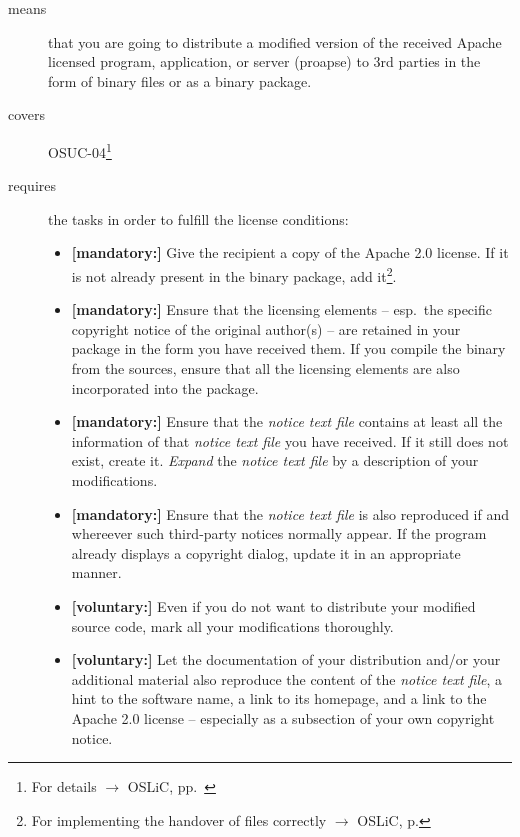 \begin{description}
\item[means] that you are going to distribute a modified version of the received
Apache licensed pro\-gram, application, or server (proapse) to 3rd parties in
the form of binary files or as a binary package.
\item[covers] OSUC-04\footnote{For details $\rightarrow$ OSLiC, pp.\ \pageref{OSUC-04-DEF}}
\item[requires] the tasks in order to fulfill the license conditions:
\begin{itemize}

 \item \textbf{[mandatory:]} Give the recipient a copy of the Apache 2.0
  license. If it is not already present in the binary package, add
  it\footnote{For implementing the handover of files correctly $\rightarrow$
  OSLiC, p. \pageref{DistributingFilesHint}}.
  
  \item \textbf{[mandatory:]} Ensure that the licensing elements -- esp.\ the
  specific copyright notice of the original author(s) -- are retained in your
  package in the form you have received them. If you compile the binary from the
  sources, ensure that all the licensing elements are also incorporated into the
  package.
  
  \item \textbf{[mandatory:]} Ensure that the \emph{notice text file} contains
  at least all the information of that \emph{notice text file} you have
  received. If it still does not exist, create it. \emph{Expand} the
  \emph{notice text file} by a description of your modifications.
  
  \item \textbf{[mandatory:]} Ensure that the \emph{notice text file} is also
  reproduced if and whereever such third-party notices normally appear. If the
  program already displays a copyright dialog, update it in an appropriate
  manner.
 
  \item \textbf{[voluntary:]} Even if you do not want to distribute your
  modified source code, mark all your modifications thoroughly.
 
  \item \textbf{[voluntary:]} Let the documentation of your distribution and/or
  your additional material also reproduce the content of the \emph{notice text
  file}, a hint to the software name, a link to its homepage, and a link to the
  Apache 2.0 license -- especially as a subsection of your own copyright notice.


\end{itemize}
\end{description}
